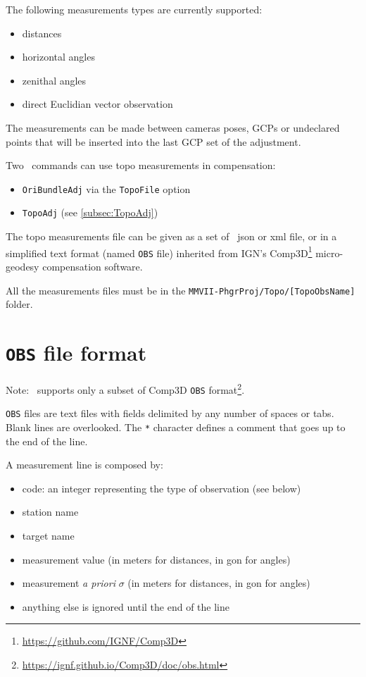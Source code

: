 The following measurements types are currently supported:

\begin{itemize}
    \item distances
    \item horizontal angles
    \item zenithal angles
    \item direct Euclidian vector observation
\end{itemize}

The measurements can be made between cameras poses, GCPs or undeclared points that will be inserted into the last GCP set of the adjustment.

Two \CdPPP\ commands can use topo measurements in compensation:
\begin{itemize}
    \item \texttt{OriBundleAdj} via the \texttt{TopoFile} option
    \item \texttt{TopoAdj} (see \ref{subsec:TopoAdj})
\end{itemize}

The topo measurements file can be given as a set of \CdPPP\ json or xml file, or in a simplified text format (named \texttt{OBS} file) inherited from IGN's
Comp3D\footnote{\url{https://github.com/IGNF/Comp3D}} micro-geodesy compensation software.

All the measurements files must be in the \texttt{MMVII-PhgrProj/Topo/[TopoObsName]} folder.

\section{\texttt{OBS} file format}
\label{sec:compObsFormat}

Note: \CdPPP\ supports only a subset of Comp3D \texttt{OBS} format\footnote{\url{https://ignf.github.io/Comp3D/doc/obs.html}}.

\texttt{OBS} files are text files with fields delimited by any number of spaces or tabs. Blank lines are overlooked.
The \texttt{*} character defines a comment that goes up to the end of the line.

A measurement line is composed by:

\begin{itemize}
    \item code: an integer representing the type of observation (see below)
    \item station name
    \item target name
    \item measurement value (in meters for distances, in gon for angles)
    \item measurement \textit{a priori} $\sigma$ (in meters for distances, in gon for angles)
    \item anything else is ignored until the end of the line
\end{itemize}

